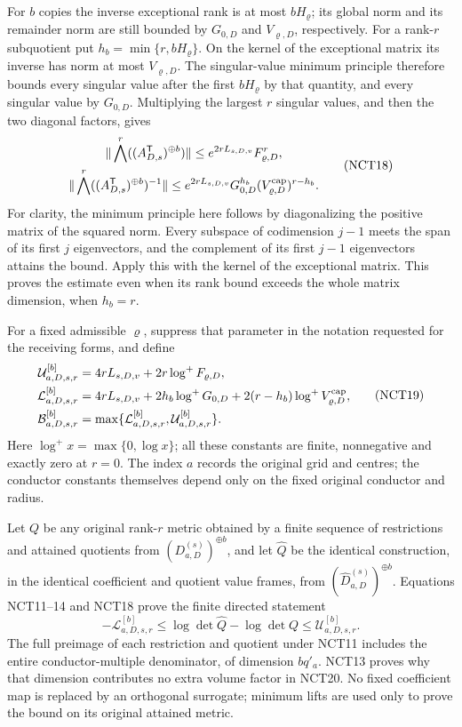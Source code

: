 \documentclass[11pt,a4paper]{article}
\begin{document}
For \(b\) copies the inverse exceptional rank is at most
\(bH_\varrho\); its global norm and its remainder norm are still
bounded by \(G_{0,D}\) and \(V_{\varrho,D}\), respectively.
For a rank-\(r\) subquotient put \(h_b=\min\{r,bH_\varrho\}\).
On the kernel of the exceptional matrix its inverse has norm at
most \(V_{\varrho,D}\).  The singular-value minimum principle
therefore bounds every singular value after the first \(bH_\varrho\)
by that quantity, and every singular value by \(G_{0,D}\).
Multiplying the largest \(r\) singular values, and then the two
diagonal factors, gives
\[
\begin{gathered}
 \|\bigwedge^r((A_{D,s}^{\mathsf T})^{\oplus b})\|
      \le e^{2rL_{s,D,v}}F_{\varrho,D}^{r},\\
 \|\bigwedge^r((A_{D,s}^{\mathsf T})^{\oplus b})^{-1}\|
      \le e^{2rL_{s,D,v}}G_{0,D}^{h_b}
                    (V_{\varrho,D}^{\rm cap})^{r-h_b}.
\end{gathered}\tag{NCT18}
\]
For clarity, the minimum principle here follows by diagonalizing
the positive matrix of the squared norm.  Every subspace of
codimension \(j-1\) meets the span of its first \(j\) eigenvectors,
and the complement of its first \(j-1\) eigenvectors attains the
bound.  Apply this with the kernel of the exceptional matrix.
This proves the estimate even when its rank bound exceeds the
whole matrix dimension, when \(h_b=r\).

For a fixed admissible \(\varrho\), suppress that parameter in the
notation requested for the receiving forms, and define
\[
\begin{aligned}
 \mathcal U_{a,D,s,r}^{[b]}
   &=4rL_{s,D,v}+2r\log^+F_{\varrho,D},\\
 \mathcal L_{a,D,s,r}^{[b]}
   &=4rL_{s,D,v}+2h_b\log^+G_{0,D}
                    +2(r-h_b)\log^+V_{\varrho,D}^{\rm cap},\\
 \mathcal B_{a,D,s,r}^{[b]}
   &=\max\{\mathcal L_{a,D,s,r}^{[b]},
                         \mathcal U_{a,D,s,r}^{[b]}\}.
\end{aligned}\tag{NCT19}
\]
Here \(\log^+x=\max\{0,\log x\}\); all these constants are
finite, nonnegative and exactly zero at \(r=0\).  The index \(a\)
records the original grid and centres; the conductor constants
themselves depend only on the fixed original conductor and radius.

Let \(Q\) be any original rank-\(r\) metric obtained by a finite
sequence of restrictions and attained quotients from
\((D_{a,D}^{(s)})^{\oplus b}\), and let \(\widehat Q\) be the
identical construction, in the identical coefficient and quotient
value frames, from \((\widehat D_{a,D}^{(s)})^{\oplus b}\).
Equations NCT11--14 and NCT18 prove the finite directed statement
\[
 \boxed{\displaystyle
 -\mathcal L_{a,D,s,r}^{[b]}
   \le\log\det\widehat Q-\log\det Q
   \le\mathcal U_{a,D,s,r}^{[b]}.}
 \tag{NCT20}
\]
The full preimage of each restriction and quotient under NCT11
includes the entire conductor-multiple denominator, of dimension
\(bq'_a\).  NCT13 proves why that dimension contributes no
extra volume factor in NCT20.  No fixed coefficient map is
replaced by an orthogonal surrogate; minimum lifts are used only
to prove the bound on its original attained metric.
\end{document}
